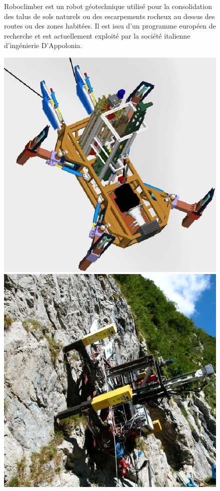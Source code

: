 \begin{figure}[!h]
  \begin{minipage}{0.49\linewidth}
\begin{flushleft}
Roboclimber est un robot géotechnique utilisé pour la consolidation des talus de sols naturels ou des escarpements rocheux au dessus des routes ou des zones habitées. Il est issu d'un programme européen de recherche et est actuellement exploité par la société italienne d'ingénierie D'Appolonia.                                                                                                                                                                                                                                                                                                       \end{flushleft}
  \centering\includegraphics[width=0.7\linewidth]{img/robotclim_sw.png}
  \end{minipage}
  \hfill
  \begin{minipage}{0.49\linewidth}
   \centering\includegraphics[width=0.7\linewidth]{img/robotclim.png}
   

\end{minipage}
\end{figure}
